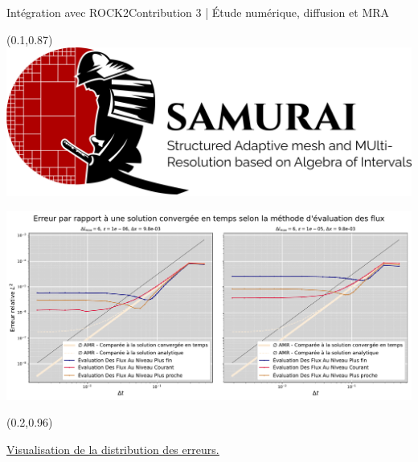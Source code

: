 \begin{frame}{Intégration avec ROCK2}{Contribution 3 | Étude numérique, diffusion et MRA}

    \begin{textblock*}{40pt}(0.1\paperwidth,0.87\paperheight)
        \includegraphics[scale=.03]{medias/2_/1_/light_logo.png}
    \end{textblock*}
    \centering
    \includegraphics[width= .9\textwidth]{medias/2_/3_/flux_reconstruction_method_diffusion.pdf}
    \begin{textblock*}{40pt}(0.2\paperwidth,0.96\paperheight)
        {\color{black}{+ Ponio}}
    \end{textblock*}
    \href{https://github.com/Ocelot-Pale/etude_MR_RK2}{\color{Primary} \underline{Visualisation de la distribution des erreurs.}}\color{black}
\end{frame}
